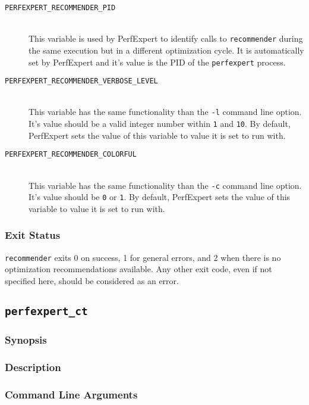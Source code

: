 \begin{description}
	\item[\texttt{PERFEXPERT\_RECOMMENDER\_PID}]\hfill \\
	This variable is used by PerfExpert to identify calls to \texttt{recommender} during the same execution but in a different optimization cycle. It is automatically set by PerfExpert and it's value is the PID of the \texttt{perfexpert} process.

	\item[\texttt{PERFEXPERT\_RECOMMENDER\_VERBOSE\_LEVEL}]\hfill \\
	This variable has the same functionality than the \texttt{-l} command line option. It's value should be a valid integer number within \texttt{1} and \texttt{10}. By default, PerfExpert sets the value of this variable to value it is set to run with.

	\item[\texttt{PERFEXPERT\_RECOMMENDER\_COLORFUL}]\hfill \\
	This variable has the same functionality than the \texttt{-c} command line option. It's value should be \texttt{0} or \texttt{1}. By default, PerfExpert sets the value of this variable to value it is set to run with.
\end{description}

\subsubsection{Exit Status}

\texttt{recommender} exits 0 on success, 1 for general errors, and 2 when there is no optimization recommendations available. Any other exit code, even if not specified here, should be considered as an error.

\subsection{\texttt{perfexpert\_ct}}

\subsubsection{Synopsis}

\subsubsection{Description}

\subsubsection{Command Line Arguments}

